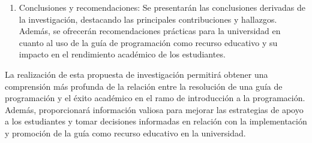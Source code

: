 \begin{enumerate}
    \item Conclusiones y recomendaciones: Se presentarán las conclusiones derivadas de la investigación, destacando las principales contribuciones y hallazgos. Además, se ofrecerán recomendaciones prácticas para la universidad en cuanto al uso de la guía de programación como recurso educativo y su impacto en el rendimiento académico de los estudiantes.
\end{enumerate}
\vfill
La realización de esta propuesta de investigación permitirá obtener una comprensión más profunda de la relación entre la resolución de una guía de programación y el éxito académico en el ramo de introducción a la programación. Además, proporcionará información valiosa para mejorar las estrategias de apoyo a los estudiantes y tomar decisiones informadas en relación con la implementación y promoción de la guía como recurso educativo en la universidad.
\vfill